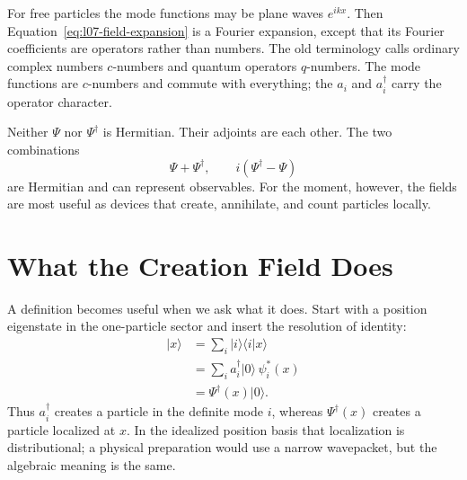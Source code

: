 For free particles the mode functions may be plane waves \(e^{ikx}\). Then Equation~\eqref{eq:l07-field-expansion} is a Fourier expansion, except that its Fourier coefficients are operators rather than numbers. The old terminology calls ordinary complex numbers \(c\)-numbers and quantum operators \(q\)-numbers. The mode functions are \(c\)-numbers and commute with everything; the \(a_i\) and \(a_i^\dagger\) carry the operator character.

Neither \(\Psi\) nor \(\Psi^\dagger\) is Hermitian. Their adjoints are each other. The two combinations
\begin{equation}
\Psi+\Psi^\dagger,
\qquad
i(\Psi^\dagger-\Psi)
\label{eq:l07-hermitian-combinations}
\end{equation}
are Hermitian and can represent observables. For the moment, however, the fields are most useful as devices that create, annihilate, and count particles locally.

\begin{classroomqa}
\end{classroomqa}

\section{What the Creation Field Does}

A definition becomes useful when we ask what it does. Start with a position eigenstate in the one-particle sector and insert the resolution of identity:
\begin{align}
|x\rangle
&=\sum_i |i\rangle\langle i|x\rangle \\
&=\sum_i a_i^\dagger|0\rangle\,\psi_i^*(x) \\
&=\Psi^\dagger(x)|0\rangle.
\label{eq:l07-local-creation}
\end{align}
Thus \(a_i^\dagger\) creates a particle in the definite mode \(i\), whereas \(\Psi^\dagger(x)\) creates a particle localized at \(x\). In the idealized position basis that localization is distributional; a physical preparation would use a narrow wavepacket, but the algebraic meaning is the same.

\begin{classroomqa}
\end{classroomqa}

